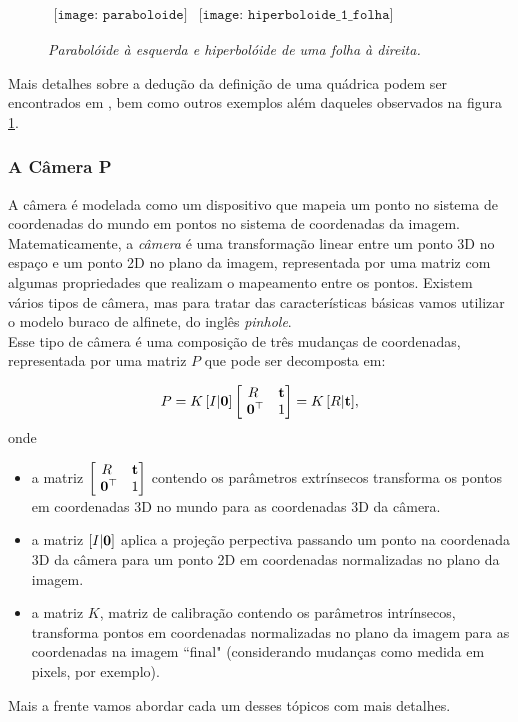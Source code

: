 \begin{figure}[!htb]
$
\begin{array}{cc}
\texttt{[image: paraboloide]}
&
\texttt{[image: hiperboloide\_1\_folha]}
\end{array}
$
\caption{\textit{Parabolóide à esquerda e hiperbolóide de uma folha à direita.}}
\label{quadricas}
\end{figure}


Mais detalhes sobre a dedução da definição de uma quádrica podem ser encontrados em \cite{Hartley2004}, bem como outros exemplos além daqueles observados na figura \ref{quadricas}.

\subsubsection{A Câmera P}

A câmera é modelada como um dispositivo que mapeia um ponto no sistema de coordenadas do mundo em pontos no sistema de coordenadas da imagem. Matematicamente, a \textit{câmera} é uma transformação linear entre um ponto 3D no espaço e um ponto 2D no plano da imagem, representada por uma matriz com algumas propriedades que realizam o mapeamento entre os pontos. Existem vários tipos de câmera, mas para tratar das características básicas vamos utilizar o modelo buraco de alfinete, do inglês \textit{pinhole}.
\\
Esse tipo de câmera é uma composição de três mudanças de coordenadas, representada por uma matriz $P$ que pode ser decomposta em:

\begin{equation*}
P = K \, [I|{\bf 0}]
\begin{bmatrix}
R&{\bf t}\\
\,\,{\bf 0}^\top &1
\end{bmatrix}
= K\,[R|{\bf t}],
\end{equation*}
onde 

\begin{itemize}
\item a matriz $\begin{bmatrix}
R&{\bf t}\\
\,\,{\bf 0}^\top &1
\end{bmatrix}$
contendo os parâmetros extrínsecos transforma os pontos em coordenadas 3D no mundo para as coordenadas 3D da câmera.
\item a matriz $[I|{\bf 0}]$ aplica a projeção perpectiva passando um ponto na coordenada 3D da câmera para um ponto 2D em coordenadas normalizadas no plano da imagem.
\item a matriz $K$, matriz de calibração contendo os parâmetros intrínsecos, transforma pontos em coordenadas normalizadas no plano da imagem para as coordenadas na imagem ``final" (considerando mudanças como medida em pixels, por exemplo).  
\end{itemize}
Mais a frente vamos abordar cada um desses tópicos com mais detalhes.

